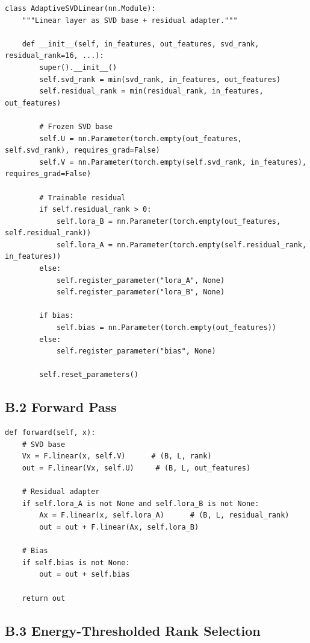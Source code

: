 \begin{lstlisting}
class AdaptiveSVDLinear(nn.Module):
    """Linear layer as SVD base + residual adapter."""
    
    def __init__(self, in_features, out_features, svd_rank, residual_rank=16, ...):
        super().__init__()
        self.svd_rank = min(svd_rank, in_features, out_features)
        self.residual_rank = min(residual_rank, in_features, out_features)
        
        # Frozen SVD base
        self.U = nn.Parameter(torch.empty(out_features, self.svd_rank), requires_grad=False)
        self.V = nn.Parameter(torch.empty(self.svd_rank, in_features), requires_grad=False)
        
        # Trainable residual
        if self.residual_rank > 0:
            self.lora_B = nn.Parameter(torch.empty(out_features, self.residual_rank))
            self.lora_A = nn.Parameter(torch.empty(self.residual_rank, in_features))
        else:
            self.register_parameter("lora_A", None)
            self.register_parameter("lora_B", None)
        
        if bias:
            self.bias = nn.Parameter(torch.empty(out_features))
        else:
            self.register_parameter("bias", None)
        
        self.reset_parameters()
\end{lstlisting}

\subsection{B.2 Forward Pass}

\begin{lstlisting}
def forward(self, x):
    # SVD base
    Vx = F.linear(x, self.V)      # (B, L, rank)
    out = F.linear(Vx, self.U)     # (B, L, out_features)
    
    # Residual adapter
    if self.lora_A is not None and self.lora_B is not None:
        Ax = F.linear(x, self.lora_A)      # (B, L, residual_rank)
        out = out + F.linear(Ax, self.lora_B)
    
    # Bias
    if self.bias is not None:
        out = out + self.bias
    
    return out
\end{lstlisting}

\subsection{B.3 Energy-Thresholded Rank Selection}

